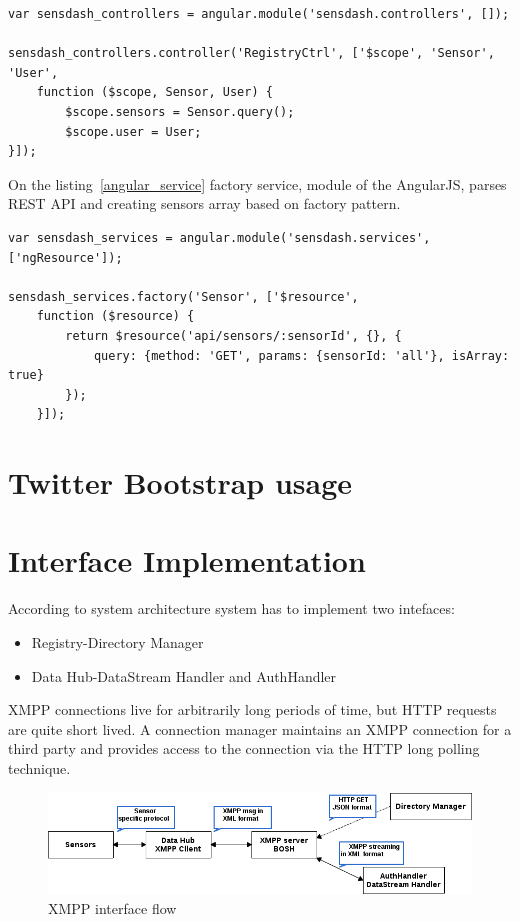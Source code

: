      \begin{lstlisting}[label=angular_controller,caption=Controller controller.js]
var sensdash_controllers = angular.module('sensdash.controllers', []);

sensdash_controllers.controller('RegistryCtrl', ['$scope', 'Sensor', 'User',
    function ($scope, Sensor, User) {
        $scope.sensors = Sensor.query();
        $scope.user = User;
}]);
    \end{lstlisting}
On the listing~\ref{angular_service} factory service, module of the AngularJS, parses REST API and creating sensors array based on factory pattern.
    \begin{lstlisting}[label=angular_service,caption=Controller controller.js]
var sensdash_services = angular.module('sensdash.services', ['ngResource']);

sensdash_services.factory('Sensor', ['$resource',
    function ($resource) {
        return $resource('api/sensors/:sensorId', {}, {
            query: {method: 'GET', params: {sensorId: 'all'}, isArray: true}
        });
    }]);
    \end{lstlisting}
\section{Twitter Bootstrap usage}


\section{Interface Implementation}
	 According to system architecture system has to implement two intefaces:
	 \begin{itemize}
	 \item Registry-Directory Manager
	 \item Data Hub-DataStream Handler and AuthHandler
	 \end{itemize}
	 XMPP connections live for arbitrarily long periods of time, but HTTP requests are quite short lived.
	A connection manager maintains an XMPP connection for a third party and provides access to the connection via the HTTP long polling technique.
	    \begin{figure}[!ht]
		\centering
		\includegraphics[scale=0.6]{images/XMPPflow.png}   
		\caption[XMPP BOSH/Stream]{XMPP interface flow}
		\label{img:interfaces}                           
		\end{figure}

